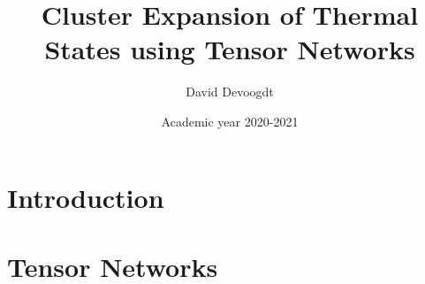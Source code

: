 \documentclass[twocolumn]{article}
\title{Cluster Expansion of Thermal States using Tensor
Networks}
\author{David Devoogdt}
\date{Academic year 2020-2021}
\newcounter{a}
\newcounter{b}
\begin{document}



\maketitle

\begin{abstract}
    
\end{abstract}

\section{Introduction}

\section{Tensor Networks}
\end{document}

